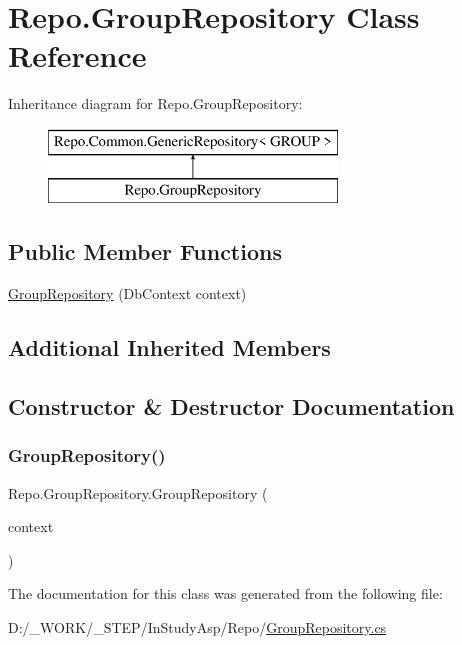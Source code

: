 \hypertarget{class_repo_1_1_group_repository}{}\section{Repo.\+Group\+Repository Class Reference}
\label{class_repo_1_1_group_repository}
Inheritance diagram for Repo.\+Group\+Repository\+:\begin{figure}[H]
\begin{center}
\leavevmode
\includegraphics[height=2.000000cm]{class_repo_1_1_group_repository}
\end{center}
\end{figure}
\subsection*{Public Member Functions}
\begin{DoxyCompactItemize}
\item 
\hyperlink{class_repo_1_1_group_repository_a0bc17bb5ba1e4129530362ed1b0fd744}{Group\+Repository} (Db\+Context context)
\end{DoxyCompactItemize}
\subsection*{Additional Inherited Members}


\subsection{Constructor \& Destructor Documentation}
\mbox{\label{class_repo_1_1_group_repository_a0bc17bb5ba1e4129530362ed1b0fd744}} 
\subsubsection{\texorpdfstring{Group\+Repository()}{GroupRepository()}}
{\footnotesize\ttfamily Repo.\+Group\+Repository.\+Group\+Repository (\begin{DoxyParamCaption}\item[{Db\+Context}]{context }\end{DoxyParamCaption})}



The documentation for this class was generated from the following file\+:\begin{DoxyCompactItemize}
\item 
D\+:/\+\_\+\+W\+O\+R\+K/\+\_\+\+S\+T\+E\+P/\+In\+Study\+Asp/\+Repo/\hyperlink{_group_repository_8cs}{Group\+Repository.\+cs}\end{DoxyCompactItemize}
